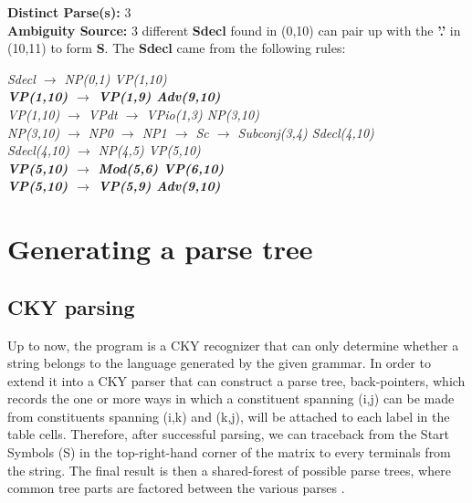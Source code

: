 \documentclass{article}
\begin{document}
\textbf{Distinct Parse(s):} 3\\

\textbf{Ambiguity Source:} 3 different \textbf{Sdecl} found in (0,10) can pair up with the \textbf{'.'} in (10,11) to form \textbf{S}. The \textbf{Sdecl} came from the following rules:

\begin{center}
	\emph{Sdecl $\rightarrow$ NP(0,1) VP(1,10)}\\
	\textbf{\emph{VP(1,10) $\rightarrow$ VP(1,9) Adv(9,10)}}\\
	\emph{VP(1,10) $\rightarrow$ VPdt $\rightarrow$ VPio(1,3) NP(3,10)}\\
	
	\emph{NP(3,10) $\rightarrow$ NP0 $\rightarrow$ NP1 $\rightarrow$ Sc $\rightarrow$ Subconj(3,4) Sdecl(4,10)}\\
	\emph{Sdecl(4,10) $\rightarrow$ NP(4,5) VP(5,10)}\\
	\textbf{\emph{VP(5,10) $\rightarrow$ Mod(5,6) VP(6,10)}\\
	\emph{VP(5,10) $\rightarrow$ VP(5,9) Adv(9,10)}}
\end{center}




\section{Generating a parse tree}

\subsection{CKY parsing}

Up to now, the program is a CKY recognizer that can only determine whether a string belongs to the language generated by the given grammar. In order to extend it into a CKY parser that can construct a parse tree, back-pointers, which records the one or more ways in which a constituent spanning (i,j) can be made from constituents spanning (i,k) and (k,j), will be attached to each label in the table cells. Therefore, after successful parsing, we can traceback from the Start Symbols (S) in the top-right-hand corner of the matrix to every terminals from the string. The final result is then a shared-forest of possible parse trees, where common tree parts are factored between the various parses \cite{lang1994recognition}.
\end{document}
